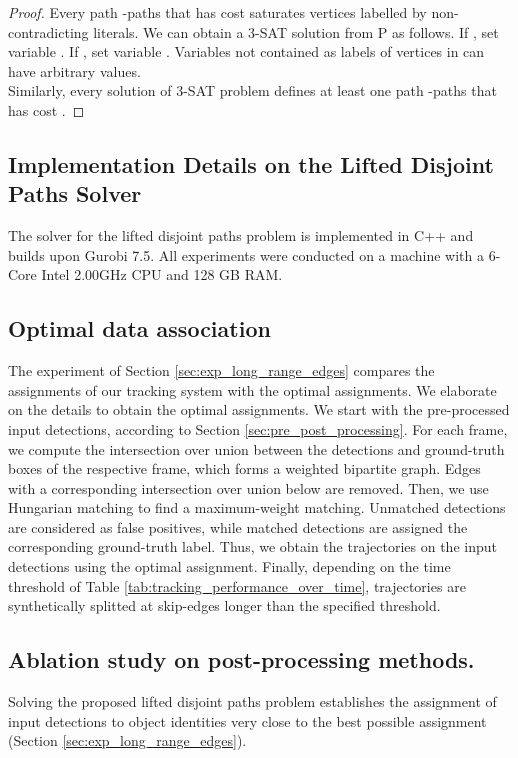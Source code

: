 \documentclass{article}
\begin{document}
\begin{proof}
 Every path -paths that has cost  saturates vertices labelled by non-contradicting literals. We can obtain a 3-SAT solution from P as follows. If , set variable . If , set variable . Variables not contained as labels of vertices in  can have arbitrary values. \\
 Similarly, every solution of 3-SAT problem defines at least one path -paths that has cost .

\end{proof} \subsection{Implementation Details on the Lifted Disjoint Paths Solver}
The solver for the lifted disjoint paths problem is implemented in C++ and builds upon Gurobi 7.5.
All experiments were conducted on a machine with a 6-Core Intel 2.00GHz CPU and 128 GB RAM. 

\subsection{Optimal data association}
\label{sec:optimal_assignment_definition}
The experiment of Section \ref{sec:exp_long_range_edges} compares the assignments of our tracking system with the optimal assignments. 
We elaborate on the details to obtain the optimal assignments. 
We start with the pre-processed input detections, according to Section \ref{sec:pre_post_processing}. 
For each frame, we compute the intersection over union between the detections and ground-truth boxes of the respective frame, which forms a weighted bipartite graph. Edges with a corresponding intersection over union below  are removed. 
Then, we use Hungarian matching to find a maximum-weight matching. Unmatched detections are considered as false positives, while matched detections are assigned the corresponding ground-truth label. Thus, we obtain the trajectories on the input detections using the optimal assignment. Finally, depending on the time threshold of Table \ref{tab:tracking_performance_over_time}, trajectories are synthetically splitted at skip-edges longer than the specified threshold.



\subsection{Ablation study on post-processing methods.}
\label{sec:ablation_postprocessing}

Solving the proposed lifted disjoint paths problem establishes the assignment of input detections to object identities very close to the best possible assignment (Section \ref{sec:exp_long_range_edges}). 
\end{document}
